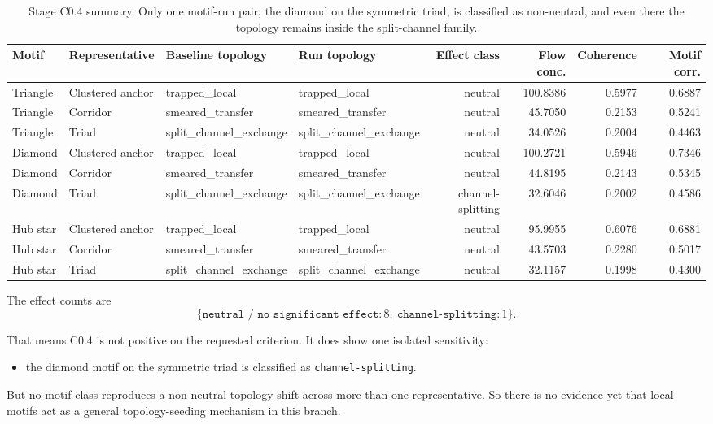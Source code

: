 \documentclass[11pt]{article}
\begin{document}
\begin{table}[t]
\centering
\scriptsize
\begin{tabular}{@{}llllrrrr@{}}
\toprule
Motif & Representative & Baseline topology & Run topology & Effect class & Flow conc. & Coherence & Motif corr. \\
\midrule
Triangle & Clustered anchor & trapped\_local & trapped\_local & neutral & 100.8386 & 0.5977 & 0.6887 \\
Triangle & Corridor & smeared\_transfer & smeared\_transfer & neutral & 45.7050 & 0.2153 & 0.5241 \\
Triangle & Triad & split\_channel\_exchange & split\_channel\_exchange & neutral & 34.0526 & 0.2004 & 0.4463 \\
Diamond & Clustered anchor & trapped\_local & trapped\_local & neutral & 100.2721 & 0.5946 & 0.7346 \\
Diamond & Corridor & smeared\_transfer & smeared\_transfer & neutral & 44.8195 & 0.2143 & 0.5345 \\
Diamond & Triad & split\_channel\_exchange & split\_channel\_exchange & channel-splitting & 32.6046 & 0.2002 & 0.4586 \\
Hub star & Clustered anchor & trapped\_local & trapped\_local & neutral & 95.9955 & 0.6076 & 0.6881 \\
Hub star & Corridor & smeared\_transfer & smeared\_transfer & neutral & 43.5703 & 0.2280 & 0.5017 \\
Hub star & Triad & split\_channel\_exchange & split\_channel\_exchange & neutral & 32.1157 & 0.1998 & 0.4300 \\
\bottomrule
\end{tabular}
\caption{Stage C0.4 summary. Only one motif-run pair, the diamond on the symmetric triad, is classified as non-neutral, and even there the topology remains inside the split-channel family.}
\label{tab:c04}
\end{table}

The effect counts are
\begin{equation}
\{\texttt{neutral / no significant effect}:8,\ \texttt{channel-splitting}:1\}.
\end{equation}

That means C0.4 is not positive on the requested criterion. It does show one isolated sensitivity:
\begin{itemize}
\item the diamond motif on the symmetric triad is classified as \texttt{channel-splitting}.
\end{itemize}
But no motif class reproduces a non-neutral topology shift across more than one representative. So there is no evidence yet that local motifs act as a general topology-seeding mechanism in this branch.
\end{document}
